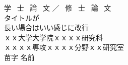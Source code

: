 \begin{titlepage}


\vspace*{120truept}
\begin{center}
  \huge{学 \ 士 \ 論 \ 文 ／ \ 修 \ 士 \ 論 \ 文}\\
  \vspace{30truept}
  \huge{タイトルが\\長い場合はいい感じに改行}\\ %
\vspace{100truept}
\LARGE{ｘｘ大学大学院ｘｘｘｘ研究科}\\
\LARGE{ｘｘｘｘ専攻ｘｘｘｘ分野ｘｘ研究室}\\
\LARGE{苗字 名前}\\
\end{center}


\end{titlepage}
